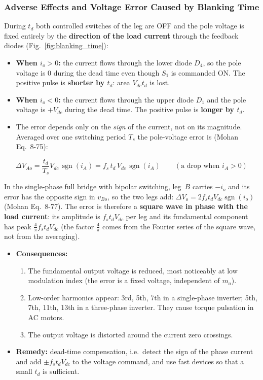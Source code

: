 \documentclass[11pt,a4paper]{article}
\begin{document}
\subsubsection{Adverse Effects and Voltage Error Caused by Blanking Time}
During $t_d$ both controlled switches of the leg are OFF and the pole voltage is fixed entirely by the \textbf{direction of the load current} through the feedback diodes (Fig.~\ref{fig:blanking_time}):
\begin{itemize}[leftmargin=*]
  \item \textbf{When $i_o > 0$:} the current flows through the lower diode $D_4$, so the pole voltage is $0$ during the dead time even though $S_1$ is commanded ON. The positive pulse is \textbf{shorter by $t_d$}: area $V_{dc}t_d$ is lost.
  \item \textbf{When $i_o < 0$:} the current flows through the upper diode $D_1$ and the pole voltage is $+V_{dc}$ during the dead time. The positive pulse is \textbf{longer by $t_d$}.
  \item The error depends only on the \emph{sign} of the current, not on its magnitude. Averaged over one switching period $T_s$ the pole-voltage error is (Mohan Eq.~8-75):
\end{itemize}
\begin{formulabox}
\begin{equation}
\Delta V_{Ao} = \frac{t_d}{T_s}V_{dc}\,\operatorname{sgn}(i_A) = f_s\,t_d\,V_{dc}\,\operatorname{sgn}(i_A) \qquad (\text{a drop when } i_A > 0)
\label{eq:deadtime_voltage_drop}
\end{equation}
\end{formulabox}
In the single-phase full bridge with bipolar switching, leg~$B$ carries $-i_o$ and its error has the opposite sign in $v_{Bo}$, so the two legs add: $\Delta V_o = 2 f_s t_d V_{dc}\operatorname{sgn}(i_o)$ (Mohan Eq.~8-77). The error is therefore a \textbf{square wave in phase with the load current}: its amplitude is $f_s t_d V_{dc}$ per leg and its fundamental component has peak $\frac{4}{\pi}f_s t_d V_{dc}$ (the factor $\frac{4}{\pi}$ comes from the Fourier series of the square wave, not from the averaging).
\begin{itemize}[leftmargin=*]
  \item \textbf{Consequences:}
  \begin{enumerate}
    \item The fundamental output voltage is reduced, most noticeably at low modulation index (the error is a fixed voltage, independent of $m_a$).
    \item Low-order harmonics appear: 3rd, 5th, 7th in a single-phase inverter; 5th, 7th, 11th, 13th in a three-phase inverter. They cause torque pulsation in AC motors.
    \item The output voltage is distorted around the current zero crossings.
  \end{enumerate}
  \item \textbf{Remedy:} dead-time compensation, i.e.\ detect the sign of the phase current and add $\pm f_s t_d V_{dc}$ to the voltage command, and use fast devices so that a small $t_d$ is sufficient.
\end{itemize}
\end{document}
